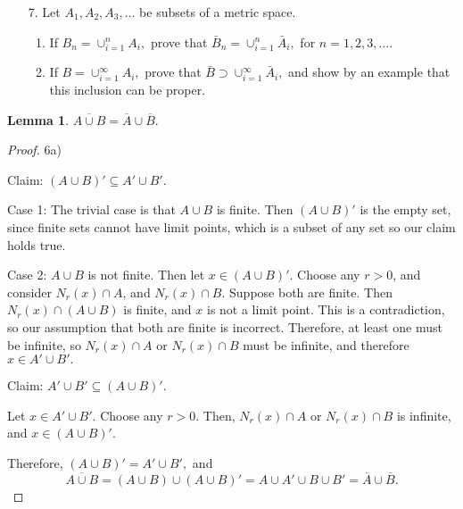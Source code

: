 \documentclass[10pt]{article}
\theoremstyle{definition}
\theoremstyle{plain}
\newtheorem{lemma}[equation]{Lemma}
\begin{document}
\pagebreak



\begin{enumerate}
\item[7.] Let $A_1,A_2,A_3,\dots$ be subsets of a metric space.
\begin{enumerate}
  \item If $B_n = \cup_{i=1}^{n} A_i,$ prove that $\bar{B}_n = \cup_{i=1}^{n} \bar{A}_i,$ for $n=1,2,3,\dots$.
  \item If $B = \cup_{i=1}^{\infty} A_i,$ prove that $\bar{B} \supset \cup_{i=1}^{\infty} \bar{A}_i,$ and show by an example that this inclusion can be proper.
\end{enumerate}

\end{enumerate}

\begin{lemma}
$\overline{A\cup B} = \overline{A}\cup\overline{B}.$
\end{lemma}

\begin{proof}
6a)

Claim: $(A\cup B)' \subseteq A' \cup B'.$

Case 1: The trivial case is that $A\cup B$ is finite. Then $(A\cup B)'$ is the empty set, since finite sets cannot have limit points, which is a subset of any set so our claim holds true.

Case 2: $A\cup B$ is not finite. Then let $x\in(A\cup B)'$. Choose any $r>0$, and consider $N_r (x) \cap A$, and $N_r (x) \cap B$. Suppose both are finite. Then $N_r (x) \cap (A\cup B)$ is finite, and $x$ is not a limit point. This is a contradiction, so our assumption that both are finite is incorrect. Therefore, at least one must be infinite, so $N_r (x) \cap A$ or $N_r (x) \cap B$ must be infinite, and therefore $x\in A'\cup B'.$

Claim: $A' \cup B' \subseteq (A\cup B)'.$

Let $x\in A'\cup B'.$ Choose any $r>0$. Then, $N_r (x) \cap A$ or $N_r (x) \cap B$  is infinite, and $x\in(A\cup B)'$.

Therefore, $(A\cup B)' = A' \cup B',$ and
$$\overline{A\cup B} = (A\cup B)\cup(A\cup B)' = A\cup A' \cup B \cup B' = \overline{A}\cup\overline{B}.$$
\end{proof}
\end{document}
